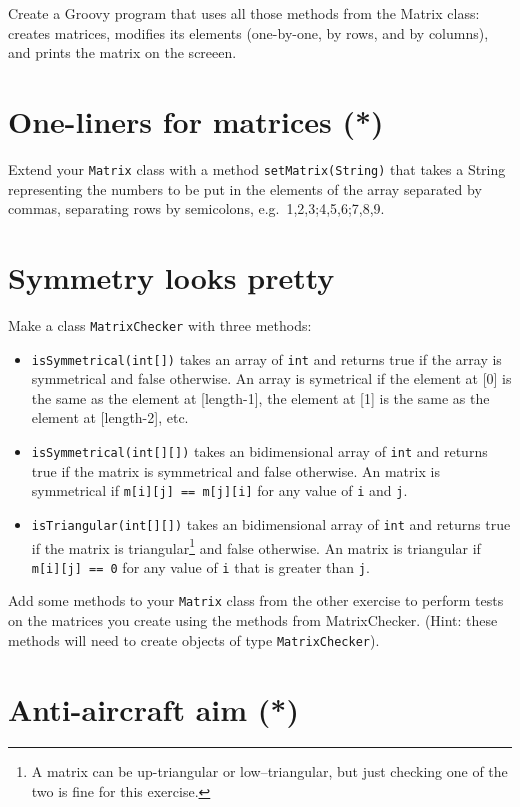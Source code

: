 \documentclass{article}
\begin{document}
Create a Groovy program that uses all those methods from the Matrix class:
creates matrices, modifies its elements (one-by-one, by rows, and by
columns), and prints the matrix on the screeen. 

\section{One-liners for matrices (*)}
\label{sec:creat-matr-one}

Extend your \verb+Matrix+ class with a method \verb+setMatrix(String)+
that takes a String representing the numbers to be put in the elements
of the array separated by commas, separating rows by semicolons,
e.g.~1,2,3;4,5,6;7,8,9. 

\section{Symmetry looks pretty}
\label{sec:symm-looks-pretty}

Make a class \verb+MatrixChecker+ with three methods: 

\begin{itemize}
\item \verb+isSymmetrical(int[])+ takes an array of \verb+int+ and
  returns true if the array is symmetrical and false otherwise. An
  array is symetrical if the element at [0] is the same as the
  element at [length-1], the element at [1] is the same as the
  element at [length-2], etc.
\item \verb+isSymmetrical(int[][])+ takes an bidimensional array of
  \verb+int+ and returns true if the matrix is symmetrical and false
  otherwise. An matrix is symmetrical if \verb+m[i][j] == m[j][i]+ for
  any value of \verb+i+ and \verb+j+.
\item \verb+isTriangular(int[][])+ takes an bidimensional array of
  \verb+int+ and returns true if the matrix is triangular\footnote{A
    matrix can be up-triangular or low--triangular, but just checking
    one of the two is fine for this exercise.} and false
  otherwise. An matrix is triangular if \verb+m[i][j] == 0+ for
  any value of \verb+i+ that is greater than \verb+j+.
\end{itemize}

Add some methods to your \verb+Matrix+ class from the other exercise to
perform tests on the matrices you create using the methods from
MatrixChecker. (Hint: these methods will need to create objects of
type \verb+MatrixChecker+). 


\section{Anti-aircraft aim (*)}
\label{sec:anti-aircraft-aim}
\end{document}
